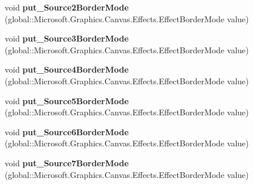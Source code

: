 \begin{DoxyCompactItemize}
\mbox{\label{interface_microsoft_1_1_graphics_1_1_canvas_1_1_effects_1_1_i_pixel_shader_effect_a9bcb461c2f6435221e9a306624acb5fb}} 
void {\bfseries put\+\_\+\+Source2\+Border\+Mode} (global\+::\+Microsoft.\+Graphics.\+Canvas.\+Effects.\+Effect\+Border\+Mode value)
\item 
\mbox{\label{interface_microsoft_1_1_graphics_1_1_canvas_1_1_effects_1_1_i_pixel_shader_effect_ab07ea308f148176bf76d36e9442cebfe}} 
void {\bfseries put\+\_\+\+Source3\+Border\+Mode} (global\+::\+Microsoft.\+Graphics.\+Canvas.\+Effects.\+Effect\+Border\+Mode value)
\item 
\mbox{\label{interface_microsoft_1_1_graphics_1_1_canvas_1_1_effects_1_1_i_pixel_shader_effect_a345d86228e0257085d62f28db41c7bb4}} 
void {\bfseries put\+\_\+\+Source4\+Border\+Mode} (global\+::\+Microsoft.\+Graphics.\+Canvas.\+Effects.\+Effect\+Border\+Mode value)
\item 
\mbox{\label{interface_microsoft_1_1_graphics_1_1_canvas_1_1_effects_1_1_i_pixel_shader_effect_a4efd2a989233ece72dae93bd93c1f1c5}} 
void {\bfseries put\+\_\+\+Source5\+Border\+Mode} (global\+::\+Microsoft.\+Graphics.\+Canvas.\+Effects.\+Effect\+Border\+Mode value)
\item 
\mbox{\label{interface_microsoft_1_1_graphics_1_1_canvas_1_1_effects_1_1_i_pixel_shader_effect_af5a93e40390458d5033ac595fd26bb74}} 
void {\bfseries put\+\_\+\+Source6\+Border\+Mode} (global\+::\+Microsoft.\+Graphics.\+Canvas.\+Effects.\+Effect\+Border\+Mode value)
\item 
\mbox{\label{interface_microsoft_1_1_graphics_1_1_canvas_1_1_effects_1_1_i_pixel_shader_effect_af16dedb735c34465db2533ae2fb72fc3}} 
void {\bfseries put\+\_\+\+Source7\+Border\+Mode} (global\+::\+Microsoft.\+Graphics.\+Canvas.\+Effects.\+Effect\+Border\+Mode value)
\item 

\end{DoxyCompactItemize}
